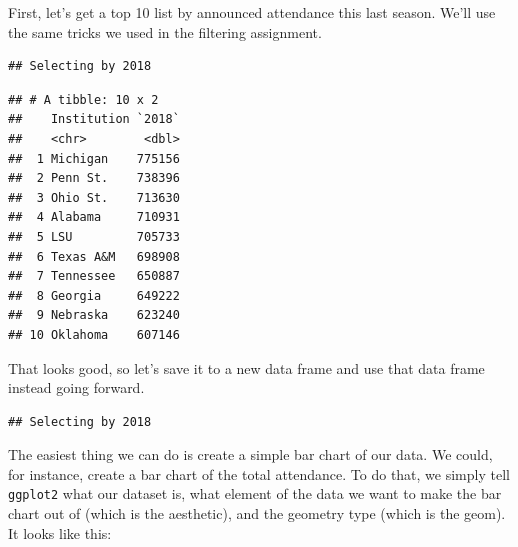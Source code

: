 \documentclass[]{book}
\newenvironment{Shaded}{\begin{snugshade}}{\end{snugshade}}
\newcommand{\KeywordTok}[1]{\textcolor[rgb]{0.13,0.29,0.53}{\textbf{#1}}}
\newcommand{\DataTypeTok}[1]{\textcolor[rgb]{0.13,0.29,0.53}{#1}}
\newcommand{\DecValTok}[1]{\textcolor[rgb]{0.00,0.00,0.81}{#1}}
\newcommand{\StringTok}[1]{\textcolor[rgb]{0.31,0.60,0.02}{#1}}
\newcommand{\OperatorTok}[1]{\textcolor[rgb]{0.81,0.36,0.00}{\textbf{#1}}}
\newcommand{\NormalTok}[1]{#1}
\begin{document}
First, let's get a top 10 list by announced attendance this last season.
We'll use the same tricks we used in the filtering assignment.

\begin{Shaded}
\end{Shaded}

\begin{verbatim}
## Selecting by 2018
\end{verbatim}

\begin{verbatim}
## # A tibble: 10 x 2
##    Institution `2018`
##    <chr>        <dbl>
##  1 Michigan    775156
##  2 Penn St.    738396
##  3 Ohio St.    713630
##  4 Alabama     710931
##  5 LSU         705733
##  6 Texas A&M   698908
##  7 Tennessee   650887
##  8 Georgia     649222
##  9 Nebraska    623240
## 10 Oklahoma    607146
\end{verbatim}

That looks good, so let's save it to a new data frame and use that data
frame instead going forward.

\begin{Shaded}
\end{Shaded}

\begin{verbatim}
## Selecting by 2018
\end{verbatim}

The easiest thing we can do is create a simple bar chart of our data. We
could, for instance, create a bar chart of the total attendance. To do
that, we simply tell \texttt{ggplot2} what our dataset is, what element
of the data we want to make the bar chart out of (which is the
aesthetic), and the geometry type (which is the geom). It looks like
this:
\end{document}
